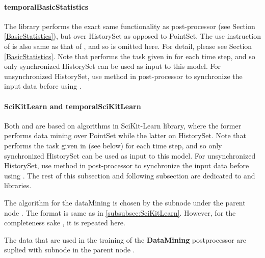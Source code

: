 \paragraph{temporalBasicStatistics}
The library  performs the exact same functionality as  post-processor (see Section \ref{BasicStatistics}), but over HistorySet as opposed to PointSet. The use instruction of  is also same as that of , and so is omitted here. For detail, please see Section \ref{BasicStatistics}. Note that  performs the task given in  for each time step, and so only synchronized HistorySet can be used as input to this model. For unsynchronized HistorySet, use  method in  post-processor to synchronize the input data before using . 
\paragraph{SciKitLearn and temporalSciKitLearn}
Both  and  are based on algorithms in SciKit-Learn library, where the former performs data mining over PointSet while the latter on HistorySet. Note that  performs the task given in  (see below) for each time step, and so only synchronized HistorySet can be used as input to this model. For unsynchronized HistorySet, use  method in  post-processor to synchronize the input data before using . The rest of this subsection and following subsection are dedicated to  and  libraries. 

The algorithm for the dataMining is chosen by the subnode
 under the parent node . The format is
same as in \ref{subsubsec:SciKitLearn}. However, for the completeness sake
, it is repeated here.

The data that are used in the training of the \textbf{DataMining}
postprocessor are suplied with subnode  in the parent node
 .


